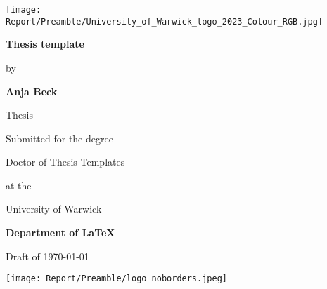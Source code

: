 \thispagestyle{empty}
\begin{titlepage}
	\centering
	\vphantom{topanchor}\par
	\vspace{-2cm}
	\texttt{[image: Report/Preamble/University\_of\_Warwick\_logo\_2023\_Colour\_RGB.jpg]}\par
	\vfill
	{\Huge\bfseries\sffamily \textcolor{brandcolour}{Thesis template}\par}
	\vfill	{\sffamily by\par}
	{\Large\bfseries\sffamily Anja Beck \par}
	\vfill
	{\Large\sffamily Thesis\par}
	{\sffamily Submitted for the degree\par}
	{\Large\sffamily Doctor of Thesis Templates\par}
	{\sffamily at the\par}
	{\Large\sffamily University of Warwick\par}
	\vfill
	{\Large\bfseries\sffamily Department of \LaTeX\par}
	{\sffamily Draft of \today\par}
    \vfill
    \texttt{[image: Report/Preamble/logo\_noborders.jpeg]}
	\vspace{-4cm}
	\vphantom{bottomanchor}
\end{titlepage}